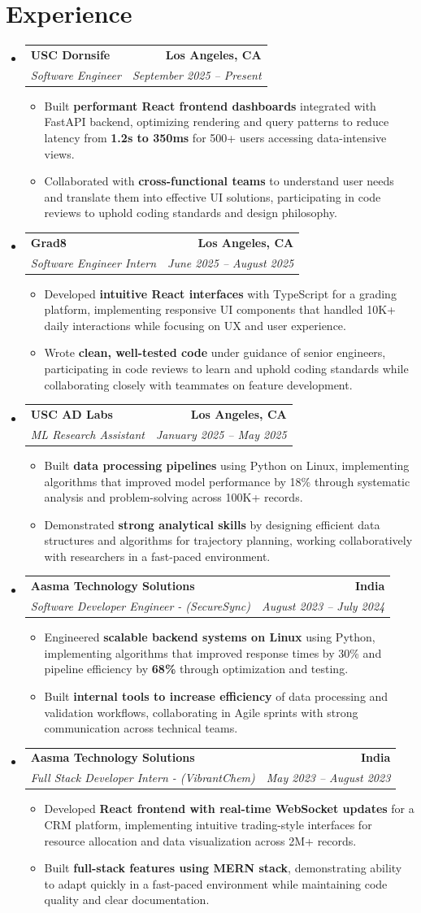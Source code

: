 \documentclass[letterpaper,10pt]{article}
\makeatletter
\newcommand{\resumeItem}[1]{\item\small{{#1 \vspace{-2pt}}}}
\newcommand{\resumeSubheading}[4]{\vspace{-1pt}\item\begin{tabular*}{1.0\textwidth}[t]{l@{\extracolsep{\fill}}r}\textbf{#1} & \textbf{\small #2} \\\textit{\small#3} & \textit{\small #4} \\\end{tabular*}\vspace{-2pt}}
\newcommand{\resumeSubHeadingListStart}{\begin{itemize}[leftmargin=0.0in, label={}]}
\newcommand{\resumeSubHeadingListEnd}{\end{itemize}}
\newcommand{\resumeItemListStart}{\begin{itemize}[leftmargin=0.15in,label=\textbullet,itemsep=2pt,topsep=0pt,parsep=0pt,partopsep=0pt]}
\newcommand{\resumeItemListEnd}{\end{itemize}\vspace{-4pt}}
\makeatother
\begin{document}
\section{Experience}
\resumeSubHeadingListStart
\resumeSubheading{USC Dornsife}{Los Angeles, CA}{Software Engineer}{September 2025 -- Present}
\resumeItemListStart
\resumeItem{Built \textbf{performant React frontend dashboards} integrated with FastAPI backend, optimizing rendering and query patterns to reduce latency from \textbf{1.2s to 350ms} for 500+ users accessing data-intensive views.}
\resumeItem{Collaborated with \textbf{cross-functional teams} to understand user needs and translate them into effective UI solutions, participating in code reviews to uphold coding standards and design philosophy.}
\resumeItemListEnd
\resumeSubheading{Grad8}{Los Angeles, CA}{Software Engineer Intern}{June 2025 -- August 2025}
\resumeItemListStart
\resumeItem{Developed \textbf{intuitive React interfaces} with TypeScript for a grading platform, implementing responsive UI components that handled 10K+ daily interactions while focusing on UX and user experience.}
\resumeItem{Wrote \textbf{clean, well-tested code} under guidance of senior engineers, participating in code reviews to learn and uphold coding standards while collaborating closely with teammates on feature development.}
\resumeItemListEnd
\resumeSubheading{USC AD Labs}{Los Angeles, CA}{ML Research Assistant}{January 2025 -- May 2025}
\resumeItemListStart
\resumeItem{Built \textbf{data processing pipelines} using Python on Linux, implementing algorithms that improved model performance by 18\% through systematic analysis and problem-solving across 100K+ records.}
\resumeItem{Demonstrated \textbf{strong analytical skills} by designing efficient data structures and algorithms for trajectory planning, working collaboratively with researchers in a fast-paced environment.}
\resumeItemListEnd
\resumeSubheading{Aasma Technology Solutions}{India}{Software Developer Engineer - (SecureSync)}{August 2023 -- July 2024}
\resumeItemListStart
\resumeItem{Engineered \textbf{scalable backend systems on Linux} using Python, implementing algorithms that improved response times by 30\% and pipeline efficiency by \textbf{68\%} through optimization and testing.}
\resumeItem{Built \textbf{internal tools to increase efficiency} of data processing and validation workflows, collaborating in Agile sprints with strong communication across technical teams.}
\resumeItemListEnd
\resumeSubheading{Aasma Technology Solutions}{India}{Full Stack Developer Intern - (VibrantChem)}{May 2023 -- August 2023}
\resumeItemListStart
\resumeItem{Developed \textbf{React frontend with real-time WebSocket updates} for a CRM platform, implementing intuitive trading-style interfaces for resource allocation and data visualization across 2M+ records.}
\resumeItem{Built \textbf{full-stack features using MERN stack}, demonstrating ability to adapt quickly in a fast-paced environment while maintaining code quality and clear documentation.}
\resumeItemListEnd
\resumeSubHeadingListEnd
\vspace{-14pt}
\end{document}
